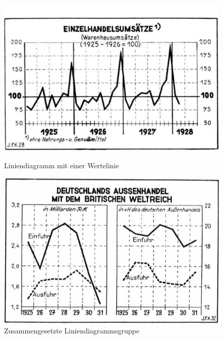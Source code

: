 \begin{figure}[H] %
    \centering
    \begin{minipage}{0.475\textwidth} %
        \centering
        \includegraphics[width=\linewidth]{Methodik/img/linebank_single.png}
        \caption{ Liniendiagramm mit einer Wertelinie}
        \label{fig:linebank_single}
    \end{minipage}\hfill %
    \begin{minipage}{0.475\textwidth} %
        \centering
        \includegraphics[width=\linewidth]{Methodik/img/linebank_composite.png}
        \caption{ Zusammengesetzte Liniendiagrammsgruppe}
        \label{fig:linebank_composite}
    \end{minipage}


\end{figure}
